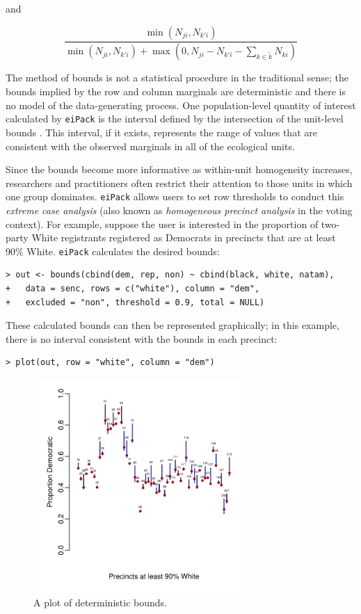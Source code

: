 \documentclass[12pt]{article}
\begin{document}
\noindent and

\begin{displaymath}
\frac{\min(N_{ji}, N_{k'i})}{\min(N_{ji}, N_{k'i}) + \max(0, N_{ji} - N_{k'i} - \sum_{k \in \tilde{k}} N_{ki})}
\end{displaymath}

The method of bounds is not a statistical procedure in the traditional
sense; the bounds implied by the row and column marginals are
deterministic and there is no model of the data-generating
process. One population-level quantity of interest calculated by
\texttt{eiPack} is the interval defined by the intersection of the
unit-level bounds \citep{Grofman00}.  This interval, if it exists,
represents the range of values that are consistent with the observed
marginals in all of the ecological units.

Since the bounds become more informative as within-unit homogeneity increases, researchers and
practitioners often restrict their attention to those units in which
one group dominates.  \texttt{eiPack} allows users to set row
thresholds to conduct this
\textit{extreme case analysis} (also known as  \textit{homogeneous
precinct analysis} in the voting context).
For example, suppose the user is interested in the proportion of
two-party White registrants registered as Democrats in precincts that
are at least 90\% White.  \texttt{eiPack} calculates the desired bounds:
\begin{verbatim}
> out <- bounds(cbind(dem, rep, non) ~ cbind(black, white, natam),
+   data = senc, rows = c("white"), column = "dem", 
+   excluded = "non", threshold = 0.9, total = NULL)
\end{verbatim} %
These calculated bounds can then be represented graphically; in this
example, there is no interval consistent with the bounds in each
precinct:
\begin{verbatim}
> plot(out, row = "white", column = "dem")
\end{verbatim}
\begin{figure}[h!]
\begin{center}
\includegraphics[height=3.2in]{white.pdf}
\end{center}
\caption{A plot of deterministic bounds.}
\label{f:mob} 
\end{figure}
\end{document}

